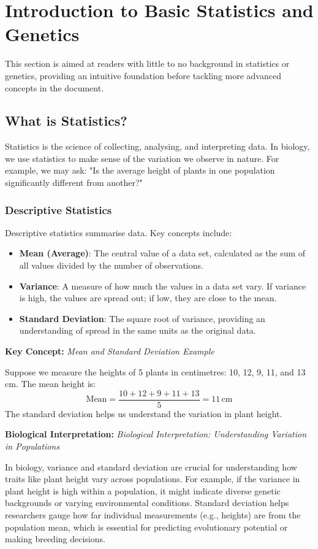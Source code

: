 \documentclass[12pt,a4paper]{article}
\newenvironment{keyconceptbox}[1][]
{\begin{basebox}[linecolor=uqblue]
\textbf{\color{uqblue}Key Concept:} \textit{#1}\par\noindent\ignorespaces}
{\end{basebox}}
\newenvironment{interpretation}[1][]
{\begin{basebox}[linecolor=uqgreen]
\textbf{\color{uqgreen}Biological Interpretation:} \textit{#1}\par\noindent\ignorespaces}
{\end{basebox}}
\begin{document}
\section{Introduction to Basic Statistics and Genetics}

This section is aimed at readers with little to no background in statistics or genetics, providing an intuitive foundation before tackling more advanced concepts in the document.

\subsection{What is Statistics?}

Statistics is the science of collecting, analysing, and interpreting data. In biology, we use statistics to make sense of the variation we observe in nature. For example, we may ask: "Is the average height of plants in one population significantly different from another?"

\subsubsection{Descriptive Statistics}

Descriptive statistics summarise data. Key concepts include:

\begin{itemize}
    \item \textbf{Mean (Average)}: The central value of a data set, calculated as the sum of all values divided by the number of observations.
    \item \textbf{Variance}: A measure of how much the values in a data set vary. If variance is high, the values are spread out; if low, they are close to the mean.
    \item \textbf{Standard Deviation}: The square root of variance, providing an understanding of spread in the same units as the original data.
\end{itemize}

\begin{keyconceptbox}[Mean and Standard Deviation Example]
Suppose we measure the heights of 5 plants in centimetres: 10, 12, 9, 11, and 13 cm. The mean height is:
\[
\text{Mean} = \frac{10 + 12 + 9 + 11 + 13}{5} = 11 \, \text{cm}
\]
The standard deviation helps us understand the variation in plant height.
\end{keyconceptbox}

\begin{interpretation}[Biological Interpretation: Understanding Variation in Populations]
In biology, variance and standard deviation are crucial for understanding how traits like plant height vary across populations. For example, if the variance in plant height is high within a population, it might indicate diverse genetic backgrounds or varying environmental conditions. Standard deviation helps researchers gauge how far individual measurements (e.g., heights) are from the population mean, which is essential for predicting evolutionary potential or making breeding decisions.
\end{interpretation}
\end{document}
